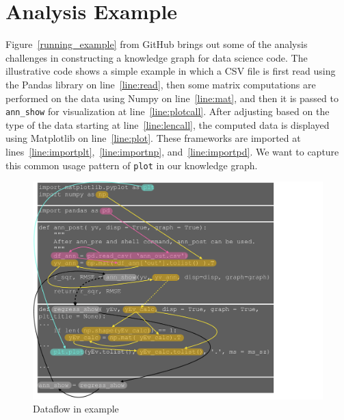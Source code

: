 \section{Analysis Example}
\label{sec:example}

Figure~\ref{running_example} from GitHub brings out some of the analysis  
challenges in constructing a knowledge graph for data science code.  
The illustrative code shows a simple example in which a CSV file is  
first read using the Pandas library on line~\ref{line:read}, then some  
matrix computations are performed on the data using Numpy on  
line~\ref{line:mat}, and then it is passed to {\tt ann\_show} for  
visualization at line~\ref{line:plotcall}.  After adjusting based on  
the type of the data starting at line~\ref{line:lencall}, the computed data is  
displayed using Matplotlib on line~\ref{line:plot}.  These frameworks  
are imported at lines~\ref{line:importplt},~\ref{line:importnp}, and~\ref{line:importpd}.  We want to  
capture this common usage pattern of {\tt plot} in our knowledge  
graph. 

\begin{figure}[htb]
\begin{center}
\includegraphics[width=5in]{paper_figures/example_flow}
\end{center}
\caption{Dataflow in example}
\label{fig:code_graph}
\end{figure}

